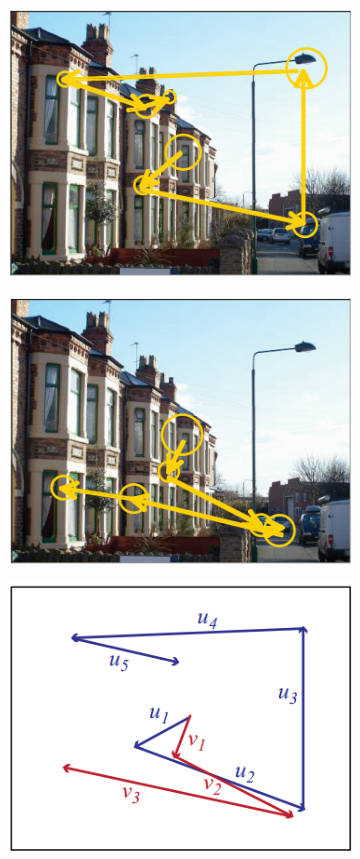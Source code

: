 \documentclass{article} %
\begin{document}
\begin{figure}
\begin{subfigure}{.33\textwidth}
  \centering
  \includegraphics[width=.8\linewidth]{scan1.png}
  \caption{}
  \label{fig:sfig21}
\end{subfigure}%
\begin{subfigure}{.33\textwidth}
  \centering
  \includegraphics[width=.8\linewidth]{scan2.png}
  \caption{}
  \label{fig:sfig22}
\end{subfigure}
\begin{subfigure}{.33\textwidth}
  \centering
  \includegraphics[width=.8\linewidth]{simple.png}

\end{subfigure}
\end{figure}
\end{document}

